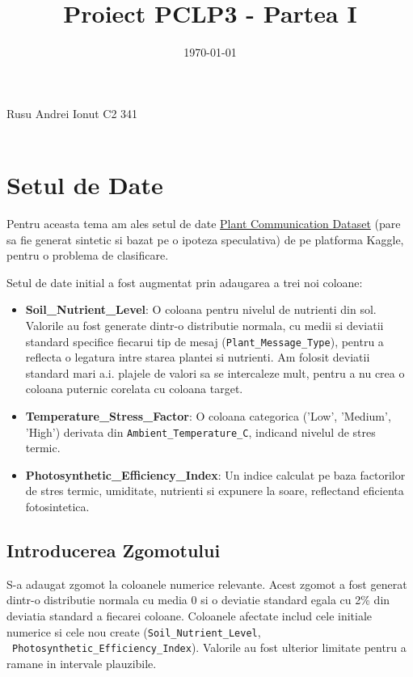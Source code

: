 \documentclass[11pt, a4paper]{article}
\title{Proiect PCLP3 - Partea I }
\date{\today}
\makeatletter
\newcommand{\studentname}{Rusu Andrei Ionut C2 341}
\renewcommand{\maketitle}{
  \begin{center}
    \Large \studentname \\
    \Huge \@title \\[1.5em]
    \large \@date
    \vspace{2em}
  \end{center}
  \par
  \thispagestyle{empty}
}
\makeatother
\begin{document}
\maketitle
\thispagestyle{empty}
\clearpage
{}

\section{Setul de Date}

Pentru aceasta tema am ales setul de date \href{https://www.kaggle.com/datasets/efeyldz/plant-communication-dataset-classification?resource=download}{Plant Communication Dataset} (pare sa fie generat sintetic si bazat pe o ipoteza speculativa) de pe platforma Kaggle, pentru o problema de clasificare.

Setul de date initial a fost augmentat prin adaugarea a trei noi coloane:
\sloppy
\begin{itemize}
    \item  \textbf{Soil\_Nutrient\_Level}: O coloana pentru nivelul de nutrienti din sol. Valorile au fost generate dintr-o distributie normala, cu medii si deviatii standard specifice fiecarui tip de mesaj (\texttt{Plant\_Message\_Type}), pentru a reflecta o legatura intre starea plantei si nutrienti. Am folosit deviatii standard mari a.i. plajele de valori sa se intercaleze mult, pentru a nu crea o coloana puternic corelata cu coloana target.
    \item \textbf{Temperature\_Stress\_Factor}: O coloana categorica ('Low', 'Medium', 'High') derivata din \texttt{Ambient\_Temperature\_C}, indicand nivelul de stres termic.
    \item \textbf{Photosynthetic\_Efficiency\_Index}: Un indice calculat pe baza factorilor de stres termic, umiditate, nutrienti si expunere la soare, reflectand eficienta fotosintetica.
\end{itemize}

\subsection{Introducerea Zgomotului}
S-a adaugat zgomot la coloanele numerice relevante. Acest zgomot a fost generat dintr-o distributie normala cu media 0 si o deviatie standard egala cu 2\% din deviatia standard a fiecarei coloane. Coloanele afectate includ cele initiale numerice si cele nou create (\texttt{Soil\_Nutrient\_Level}, \  \texttt{Photosynthetic\_Efficiency\_Index}). Valorile au fost ulterior limitate pentru a ramane in intervale plauzibile.
\end{document}

